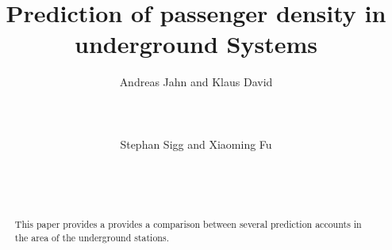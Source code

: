 \documentclass{sig-alternate}
\begin{document}
%

\title{Prediction of passenger density in underground Systems}

%
\author{
%
%
\alignauthor
Andreas Jahn and Klaus David\\
       \\
       \\
       \\
\alignauthor
Stephan Sigg and Xiaoming Fu\\
       \\
       \\
       \\
}

\maketitle

\begin{abstract}

This paper provides a provides a comparison between several prediction accounts in the area of the underground stations.

\end{abstract}
\end{document}
